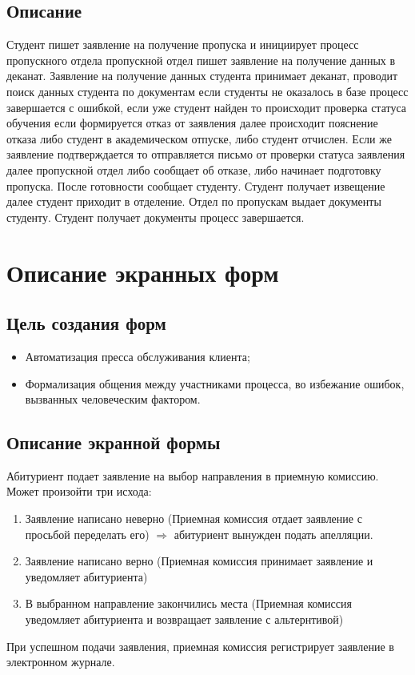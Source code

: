 \documentclass[areasetadvanced]{scrartcl}
\begin{document}
\subsection{Описание}
Студент пишет заявление на получение пропуска и инициирует процесс пропускного отдела пропускной отдел пишет заявление на получение данных в деканат. Заявление на получение данных студента принимает деканат, проводит поиск данных студента по документам если студенты не оказалось в базе процесс завершается с ошибкой, если уже студент найден то происходит проверка статуса обучения если формируется отказ от заявления далее происходит пояснение отказа либо студент в академическом отпуске, либо студент отчислен. Если же заявление подтверждается то отправляется письмо от проверки статуса заявления далее пропускной отдел либо сообщает об отказе, либо начинает подготовку пропуска. После готовности сообщает студенту. Студент получает извещение далее студент приходит в отделение. Отдел по пропускам выдает документы студенту. Студент получает документы процесс завершается.
    
\newpage
\section{Описание экранных форм}
\subsection{Цель создания форм}
\begin{itemize}
    \item Автоматизация пресса обслуживания клиента;
    \item Формализация общения между участниками процесса, во избежание ошибок, вызванных человеческим фактором.
\end{itemize}
\subsection{Описание экранной формы}
Абитуриент подает заявление на выбор направления в приемную комиссию.
Может произойти три исхода:
\begin{enumerate}
    \item Заявление написано неверно (Приемная комиссия отдает заявление с просьбой переделать его) $\Rightarrow$ абитуриент
    вынужден подать апелляции. 
    \item Заявление написано верно (Приемная комиссия принимает заявление и уведомляет абитуриента) 
    \item В выбранном направление закончились места (Приемная комиссия уведомляет абитуриента и возвращает заявление с альтернтивой)
\end{enumerate}
При успешном подачи заявления, приемная комиссия регистрирует заявление в электронном журнале. 
\newpage
\end{document}
